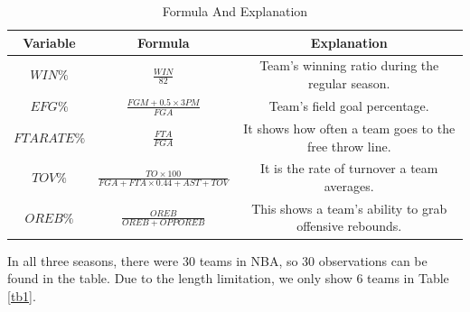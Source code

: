 \documentclass[12pt, a4paper]{article}
\begin{document}
\begin{spacing}{1.5}
\begin{table}[!h]
\centering
\renewcommand\arraystretch{1.5}
\begin{tabular}{ccc}
	\toprule[2pt]
	Variable&Formula&Explanation\\
	\midrule		
	$WIN\%$&$\frac{WIN}{82}$&Team's winning ratio during the regular season.\\
	$EFG\%$&$\frac{FGM + 0.5 \times 3PM}{FGA}$& Team's field goal percentage.\\
	$FTA RATE\%$&$\frac{FTA}{FGA}$&It shows how often a team goes to the free throw line.\\
	$TOV\%$&$\frac{TO \times 100}{FGA + FTA \times 0.44 + AST +TOV}$& It is the rate of turnover a team averages.\\
	$OREB\%$&$\frac{OREB}{OREB + OPP OREB}$& This shows a team's ability to grab offensive rebounds.\\
	\bottomrule[2pt]
\end{tabular}
\caption{Formula And Explanation}
\label{tb2}
\end{table}
\par
In all three seasons, there were 30 teams in NBA, so 30 observations can be found in the table. Due to the length limitation, we only show 6 teams in Table \ref{tb1}.%
\par

\end{spacing}
\end{document}
